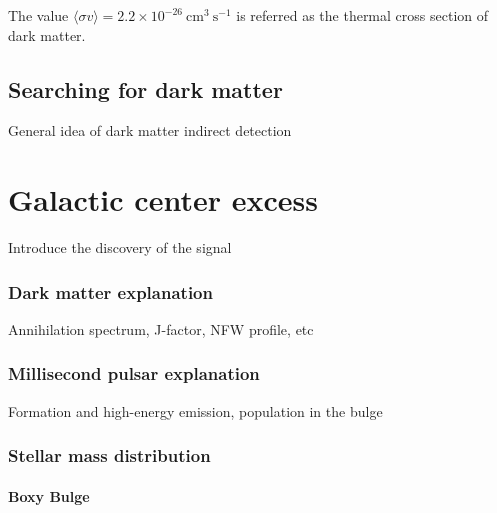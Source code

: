 \documentclass[doublespace,nopageskip]{VTthesis} %
\begin{document}
The value $\langle\sigma v\rangle = 2.2\times 10^{-26}\ \mathrm{cm}^3\ \mathrm{s}^{-1}$ is referred as the thermal cross section of dark matter.

\section{Searching for dark matter}

General idea of dark matter indirect detection



\chapter{Galactic center excess} \label{ch:GCE}

Introduce the discovery of the signal

\subsection{Dark matter explanation}

Annihilation spectrum, J-factor, NFW profile, etc

\subsection{Millisecond pulsar explanation}

Formation and high-energy emission, population in the bulge

\subsection{Stellar mass distribution}

\subsubsection{Boxy Bulge}
\end{document}
